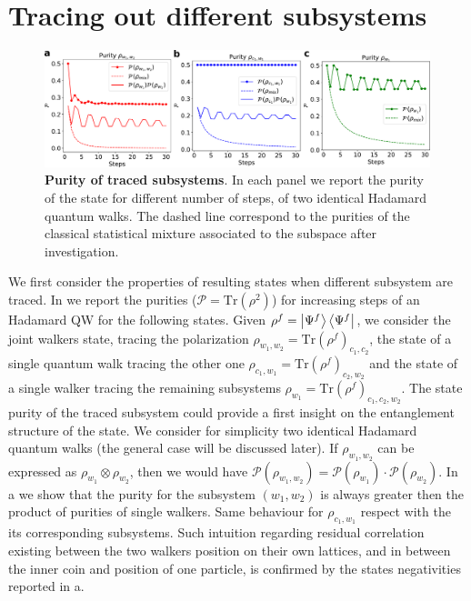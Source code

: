 \documentclass[
	aps, pra, authorblock, superscriptaddress, twocolumn,
	10pt
]{revtex4-1}
\begin{document}
\section{Tracing out different subsystems}

 \begin{figure}[t]
    \centering
    \includegraphics[width=\textwidth]{pur.pdf}
    \caption{\textbf{Purity of traced subsystems}. In each panel we report the purity of the state for different number of steps, of two identical Hadamard quantum walks. The dashed line correspond to the purities of the classical statistical mixture associated to the subspace after investigation.}
    \label{fig:pur_trace}
\end{figure}
\noindent
 We first consider the properties of resulting states when different subsystem are traced. In  we report the purities ($\mathcal{P} = \mathrm{Tr}(\rho^2)$) for increasing steps of an Hadamard QW for the following states. Given $\rho^f = \ket{\Psi^f}\bra{\Psi^f}$, we consider the joint walkers state, tracing the polarization $\rho_{w_1,w_2}= \mathrm{Tr}( \rho^f)_{c_1,c_2}$, the state of a single quantum walk tracing the other one $\rho_{c_1,w_1}= \mathrm{Tr}( \rho^f)_{c_2,w_2}$ and the state of a single walker tracing the remaining subsystems $\rho_{w_1}= \mathrm{Tr}( \rho^f)_{c_1,c_2,w_2}$.
 The state purity of the traced subsystem could provide a first insight on the entanglement structure of the state. We consider for simplicity two identical Hadamard quantum walks (the general case will be discussed later). If $\rho_{w_1,w_2}$ can be expressed as $\rho_{w_1}\otimes \rho_{w_2}$, then we would have $\mathcal{P}(\rho_{w_1,w_2}) = \mathcal{P}(\rho_{w_1})\cdot \mathcal{P}(\rho_{w_2})$. In a we show that the purity for the subsystem $(w_1, w_2)$ is always greater then the product of purities of single walkers. Same behaviour for $\rho_{c_1,w_1}$ respect with the its corresponding subsystems.
 Such intuition regarding residual correlation existing between the two walkers position on their own lattices, and in between the inner coin and position of one particle, is confirmed by the states negativities reported in a.
 
\end{document}
